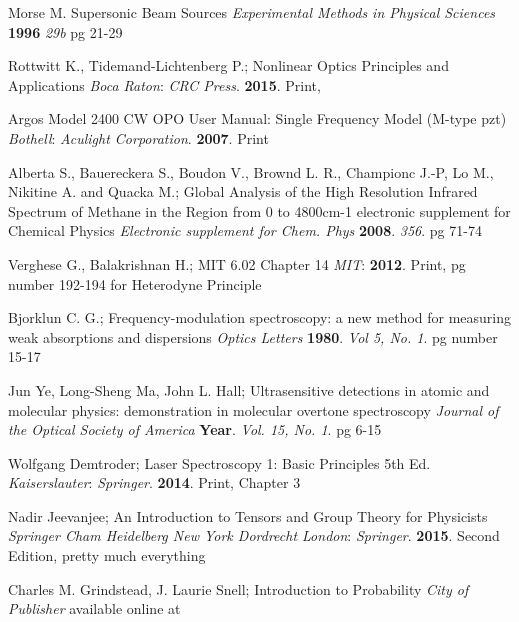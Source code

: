 \begin{thebibliography}{9}
	
		Morse M.
		Supersonic Beam Sources
		\textit{Experimental Methods in Physical Sciences}
		\textbf{1996}
		\textit{29b}
		pg 21-29
		
	
		Rottwitt K., Tidemand-Lichtenberg P.;
		Nonlinear Optics Principles and Applications
		\textit{Boca Raton}:
		\textit{CRC Press}.
		\textbf{2015}.
		Print,
		
	
		Argos Model 2400 CW OPO User Manual: Single Frequency Model (M-type pzt)
		\textit{Bothell}:
		\textit{Aculight Corporation}.
		\textbf{2007}.
		Print 
	
	
		Alberta S., Bauereckera S.,  Boudon V., Brownd L. R., Championc J.-P, Lo M., Nikitine A. and Quacka M.;
		Global Analysis of the High Resolution Infrared Spectrum of Methane  in the	Region from 0 to 4800cm-1 electronic supplement for Chemical Physics
		\textit{Electronic supplement for Chem. Phys}
		\textbf{2008}.
		\textit{356}.
		pg 71-74


		Verghese G., Balakrishnan H.;
		MIT 6.02 Chapter 14
		\textit{MIT}:
		\textbf{2012}.
		Print,
		pg number 192-194 for Heterodyne Principle


		Bjorklun C. G.;
		Frequency-modulation spectroscopy: a new method for measuring weak absorptions and dispersions
		\textit{Optics Letters}
		\textbf{1980}.
		\textit{Vol 5, No. 1}.
		pg number 15-17
		
		
		Jun Ye, Long-Sheng Ma, John L. Hall;
		Ultrasensitive detections in atomic and molecular physics: demonstration in molecular overtone spectroscopy
		\textit{Journal of the Optical Society of America}
		\textbf{Year}.
		\textit{Vol. 15, No. 1}.
		pg 6-15
		
		Wolfgang Demtroder;
		Laser Spectroscopy 1: Basic Principles 5th Ed.
		\textit{Kaiserslauter}:
		\textit{Springer}.
		\textbf{2014}.
		Print,
		Chapter 3
		
		Nadir Jeevanjee;
		An Introduction to Tensors and Group Theory for Physicists
		\textit{Springer Cham Heidelberg New York Dordrecht London}:
		\textit{Springer}.
		\textbf{2015}.
		Second Edition,
		pretty much everything
		
		Charles M. Grindstead, J. Laurie Snell;
		Introduction to Probability
		\textit{City of Publisher}
		available online at
\end{thebibliography}